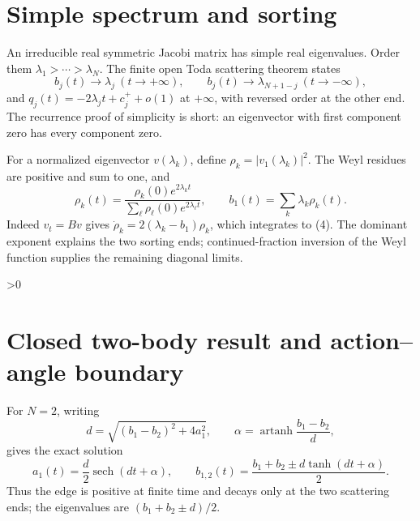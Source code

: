 \documentclass[10pt]{article}
\newcommand{\sech}{\operatorname{sech}}
\begin{document}
\section{Simple spectrum and sorting}
An irreducible real symmetric Jacobi matrix has simple real eigenvalues. Order
them \(\lambda_1>\cdots>\lambda_N\). The finite open Toda scattering theorem
states
\begin{equation}
 b_j(t)\to\lambda_j\ (t\to+\infty),\qquad
 b_j(t)\to\lambda_{N+1-j}\ (t\to-\infty), \tag{3}
\end{equation}
and \(q_j(t)=-2\lambda_jt+c_j^++o(1)\) at \(+\infty\), with reversed order at
the other end. The recurrence proof of simplicity is short: an eigenvector
with first component zero has every component zero.

For a normalized eigenvector \(v(\lambda_k)\), define
\(\rho_k=|v_1(\lambda_k)|^2\). The Weyl residues are positive and sum to one,
and
\begin{equation}
 \rho_k(t)=\frac{\rho_k(0)e^{2\lambda_kt}}
 {\sum_\ell\rho_\ell(0)e^{2\lambda_\ell t}},\qquad
 b_1(t)=\sum_k\lambda_k\rho_k(t). \tag{4}
\end{equation}
Indeed \(v_t=Bv\) gives
\(\dot\rho_k=2(\lambda_k-b_1)\rho_k\), which integrates to (4). The dominant
exponent explains the two sorting ends; continued-fraction inversion of the
Weyl function supplies the remaining diagonal limits.

\ifnum\CRevisionRound>0
\section{Closed two-body result and action--angle boundary}
For \(N=2\), writing
\[
 d=\sqrt{(b_1-b_2)^2+4a_1^2},\qquad
 \alpha=\operatorname{artanh}\frac{b_1-b_2}{d},
\]
gives the exact solution
\begin{equation}
 a_1(t)=\frac d2\sech(dt+\alpha),\qquad
 b_{1,2}(t)=\frac{b_1+b_2\pm d\tanh(dt+\alpha)}2. \tag{5}
\end{equation}
Thus the edge is positive at finite time and decays only at the two scattering
ends; the eigenvalues are \((b_1+b_2\pm d)/2\).
\end{document}
